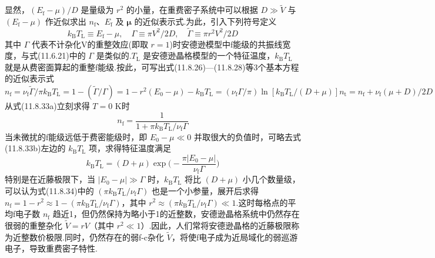 显然，$(E_{\mathrm{f}}-\mu)/D$ 是量级为 $r^{2}$ 的小量，在重费密子系统中可以根据 $D\gg\widetilde{V}$ 与 $(E_{\mathrm{f}}-\mu)$ 作近似求出 $n_{\mathrm{f}}$、$E_{\mathrm{f}}$ 及 $\boldsymbol{\mu}$ 的近似表示式.为此，引入下列符号定义
\begin{equation}
  k_{\mathrm{B}}T_{\mathrm{L}}\equiv E_{\mathrm{f}}-\mu,\quad
  \Gamma\equiv\pi V^{2}/2D,\quad
  \widetilde{\Gamma}\equiv\pi r^{2}V^{2}/2D
\end{equation}
其中 $\Gamma$ 代表不计杂化V的重整效应(即取 $r=1$)时安德逊模型中f能级的共振线宽度，与式(11.6.21)中的 $\Gamma$ 是类似的.$T_{\mathrm{L}}$ 是安德逊晶格模型的一个特征温度，$k_{\mathrm{B}}T_{\mathrm{L}}$ 就是从费密面算起的重整f能级.按此，可写出式(11.8.26)—(11.8.28)等3个基本方程的近似表示式
\begin{subequations}
\begin{equation}
  n_{\mathrm{f}}=\nu_{\mathrm{f}}\widetilde{\Gamma}/\pi k_{\mathrm{B}}T_{\mathrm{L}}
  =1-(\widetilde{\Gamma}/\Gamma)=1-r^{2}
\end{equation}
\begin{equation}
  (E_{0}-\mu)-k_{\mathrm{B}}T_{\mathrm{L}}=(\nu_{\mathrm{f}}\Gamma/\pi)\ln[k_{\mathrm{B}}T_{\mathrm{L}}/(D+\mu)]
\end{equation}
\begin{equation}
  n_{\mathrm{t}}=n_{\mathrm{f}}+\nu_{\mathrm{f}}(\mu+D)/2D
\end{equation}
\end{subequations}
从式(11.8.33a)立刻求得 $T=0$ K时
\begin{equation}
  n_{\mathrm{f}}=\frac{1}{1+\pi k_{\mathrm{B}}T_{\mathrm{L}}/\nu_{\mathrm{f}}\Gamma}
\end{equation}
当未微扰的f能级远低于费密能级时，即 $E_{0}-\mu\ll 0$ 并取很大的负值时，可略去式(11.8.33b)左边的 $k_{\mathrm{B}}T_{\mathrm{L}}$ 项，求得特征温度满足
\begin{equation}
  k_{\mathrm{B}}T_{\mathrm{L}}=(D+\mu)\exp\biggl(-\frac{\pi|E_{0}-\mu|}{\nu_{\mathrm{f}}\Gamma}\biggr)
\end{equation}
特别是在近藤极限下，当 $|E_{0}-\mu|\gg\Gamma$ 时，$k_{\mathrm{B}}T_{\mathrm{L}}$ 将比 $(D+\mu)$ 小几个数量级，可以认为式(11.8.34)中的 $(\pi k_{\mathrm{B}}T_{\mathrm{L}}/\nu_{\mathrm{f}}\Gamma)$ 也是一个小参量，展开后求得 $n_{\mathrm{f}}=1-r^{2}\approx 1-(\pi k_{\mathrm{B}}T_{\mathrm{L}}/\nu_{\mathrm{f}}\Gamma)$，其中 $r^{2}\approx(\pi k_{\mathrm{B}}T_{\mathrm{L}}/\nu_{\mathrm{f}}\Gamma)\ll 1$.这时每格点的平均f电子数 $n_{\mathrm{f}}$ 趋近1，但仍然保持为略小于1的近整数，安德逊晶格系统中仍然存在很弱的重整杂化 $\widetilde{V}=rV$（其中 $r^{2}\ll 1$）.因此，人们常将安德逊晶格的近藤极限称为近整数价极限.同时，仍然存在的弱f-c杂化 $\widetilde{V}$，将使f电子成为近局域化的弱巡游电子，导致重费密子特性.

